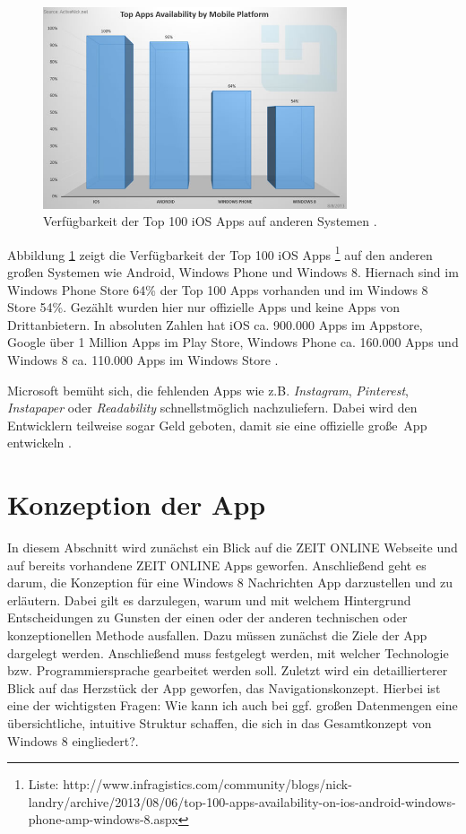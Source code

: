 \documentclass[12pt,a4paper,bibtotoc,abstracton]{scrartcl}
\begin{document}
\begin{figure}[h]	
	\centering
	\includegraphics[width=0.8\textwidth]{Bilder/Abbildungen/store_chart.jpg} 
	\caption[Die Verfügbarkeit der Top 100 iOS Apps]{Verfügbarkeit der Top 100 iOS Apps auf anderen Systemen \citep{WinbetaStore2013}.}
	\label{fig:storechart}
\end{figure}  

Abbildung \ref{fig:storechart} zeigt die Verfügbarkeit der Top 100 iOS Apps \footnote{Liste: http://www.infragistics.com/community/blogs/nick-landry/archive/2013/08/06/top-100-apps-availability-on-ios-android-windows-phone-amp-windows-8.aspx} auf den anderen großen Systemen wie Android, Windows Phone und Windows 8. Hiernach sind im Windows Phone Store 64\% der Top 100 Apps vorhanden und im Windows 8 Store 54\%. Gezählt wurden hier nur offizielle Apps und keine Apps von Drittanbietern. In absoluten Zahlen hat iOS ca. 900.000 Apps im Appstore, Google über 1 Million Apps im Play Store, Windows Phone ca. 160.000 Apps und Windows 8 ca. 110.000 Apps im Windows Store \citep{WinbetaStore2013}.

Microsoft bemüht sich, die fehlenden Apps wie z.B. \textit{Instagram}, \textit{Pinterest}, \textit{Instapaper} oder \textit{Readability} schnellstmöglich nachzuliefern. Dabei wird den Entwicklern teilweise sogar Geld geboten, damit sie eine offizielle \glqq große\grqq\ App entwickeln \citep{WinbetaStore2013}.

\newpage
\section{Konzeption der App}
\label{sec:konzeption}
In diesem Abschnitt wird zunächst ein Blick auf die ZEIT ONLINE Webseite und auf bereits vorhandene ZEIT ONLINE Apps geworfen. Anschließend geht es darum, die Konzeption für eine Windows 8 Nachrichten App darzustellen und zu erläutern. Dabei gilt es darzulegen, warum und mit welchem Hintergrund Entscheidungen zu Gunsten der einen oder der anderen technischen oder konzeptionellen Methode ausfallen. Dazu müssen zunächst die Ziele der App dargelegt werden. Anschließend muss festgelegt werden, mit welcher Technologie bzw. Programmiersprache gearbeitet werden soll. Zuletzt wird ein detaillierterer Blick auf das Herzstück der App geworfen, das Navigationskonzept. Hierbei ist eine der wichtigsten Fragen: \glqq Wie kann ich auch bei ggf. großen Datenmengen eine übersichtliche, intuitive Struktur schaffen, die sich in das Gesamtkonzept von Windows 8 eingliedert?\grqq.
\end{document}
